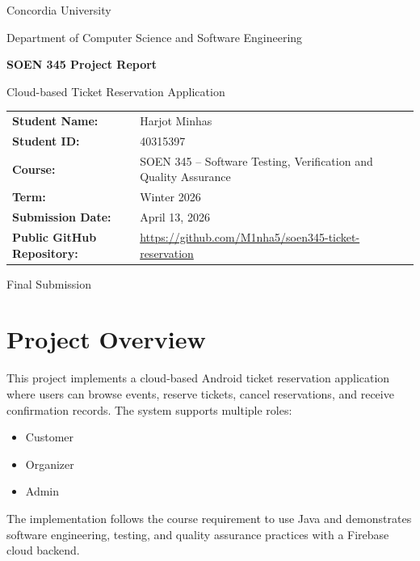 \documentclass[12pt,a4paper]{article}
\begin{document}
\begin{titlepage}
    \centering
    {\Large Concordia University\par}
    \vspace{0.3cm}
    {\large Department of Computer Science and Software Engineering\par}
    \vspace{1.4cm}
    {\Huge \textbf{SOEN 345 Project Report}\par}
    \vspace{0.4cm}
    {\Large Cloud-based Ticket Reservation Application\par}
    \vspace{1.4cm}

    \begin{tabular}{>{\bfseries}p{4.4cm}p{8.2cm}}
        Student Name: & Harjot Minhas \\
        Student ID: & 40315397 \\
        Course: & SOEN 345 -- Software Testing, Verification and Quality Assurance \\
        Term: & Winter 2026 \\
        Submission Date: & April 13, 2026 \\
        Public GitHub Repository: & \url{https://github.com/M1nha5/soen345-ticket-reservation} \\
    \end{tabular}

    \vfill
    {\large Final Submission\par}
\end{titlepage}

\tableofcontents
\newpage

\section{Project Overview}

This project implements a cloud-based Android ticket reservation application where users can browse events, reserve tickets, cancel reservations, and receive confirmation records. The system supports multiple roles:

\begin{itemize}
    \item Customer
    \item Organizer
    \item Admin
\end{itemize}

The implementation follows the course requirement to use Java and demonstrates software engineering, testing, and quality assurance practices with a Firebase cloud backend.
\end{document}
